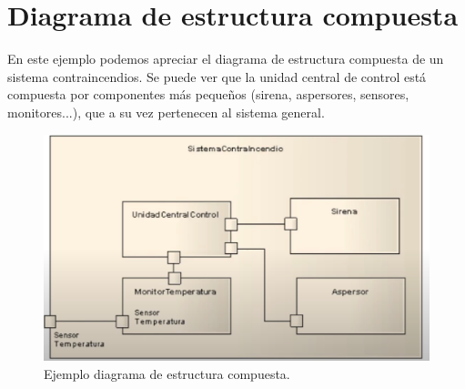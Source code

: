 \documentclass[a4paper, 12pt]{book}
\begin{document}
\section{Diagrama de estructura compuesta}
En este ejemplo podemos apreciar el diagrama de estructura compuesta de un sistema contraincendios. Se puede ver que la unidad central de control está compuesta por componentes más pequeños (sirena, aspersores, sensores, monitores...), que a su vez pertenecen al sistema general.
\begin{figure}
	\centering
	\includegraphics[width=12cm, keepaspectratio]{img/diagrama_estructura_compuesta.png}
	\caption{Ejemplo diagrama de estructura compuesta.}\label{fig:diagrama_estructura_compuesta}
\end{figure}
\end{document}
